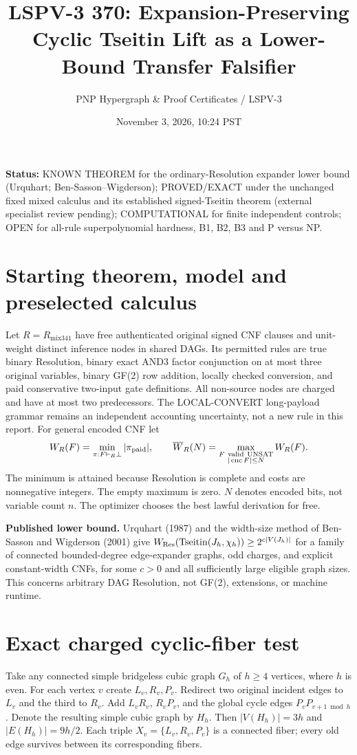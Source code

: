\documentclass[11pt]{article}
\title{LSPV-3 370: Expansion-Preserving Cyclic Tseitin Lift as a Lower-Bound Transfer Falsifier}
\author{PNP Hypergraph \& Proof Certificates / LSPV-3}
\date{November 3, 2026, 10:24 PST}
\begin{document}
\maketitle
\noindent\textbf{Status:} KNOWN THEOREM for the ordinary-Resolution expander lower bound (Urquhart; Ben-Sasson--Wigderson); PROVED/EXACT under the unchanged fixed mixed calculus and its established signed-Tseitin theorem (external specialist review pending); COMPUTATIONAL for finite independent controls; OPEN for all-rule superpolynomial hardness, B1, B2, B3 and P versus NP.

\section*{Starting theorem, model and preselected calculus}
Let $R=R_{\mathrm{mix341}}$ have free authenticated original signed CNF clauses and unit-weight distinct inference nodes in shared DAGs. Its permitted rules are true binary Resolution, binary exact AND3 factor conjunction on at most three original variables, binary GF(2) row addition, locally checked conversion, and paid conservative two-input gate definitions. All non-source nodes are charged and have at most two predecessors. The LOCAL-CONVERT long-payload grammar remains an independent accounting uncertainty, not a new rule in this report. For general encoded CNF let
\[
W_R(F)=\min_{\pi:F\vdash_R\bot}|\pi_{\rm paid}|,\qquad
\overline W_R(N)=\max_{\substack{F\ {\rm valid\ UNSAT}\\ |\operatorname{enc}F|\le N}}W_R(F).
\]
The minimum is attained because Resolution is complete and costs are nonnegative integers. The empty maximum is zero. $N$ denotes encoded bits, not variable count $n$. The optimizer chooses the best lawful derivation for free.

\textbf{Published lower bound.} Urquhart (1987) and the width-size method of Ben-Sasson and Wigderson (2001) give $W_{\rm Res}(\mathrm{Tseitin}(J_h,\chi_h))\ge 2^{c|V(J_h)|}$ for a family of connected bounded-degree edge-expander graphs, odd charges, and explicit constant-width CNFs, for some $c>0$ and all sufficiently large eligible graph sizes. This concerns arbitrary DAG Resolution, not GF(2), extensions, or machine runtime.

\section*{Exact charged cyclic-fiber test}
Take any connected simple bridgeless cubic graph $G_h$ of $h\ge4$ vertices, where $h$ is even. For each vertex $v$ create $L_v,R_v,P_v$. Redirect two original incident edges to $L_v$ and the third to $R_v$. Add $L_vR_v$, $R_vP_v$, and the global cycle edges $P_vP_{v+1\bmod h}$. Denote the resulting simple cubic graph by $H_h$. Then $|V(H_h)|=3h$ and $|E(H_h)|=9h/2$. Each triple $X_v=\{L_v,R_v,P_v\}$ is a connected fiber; every old edge survives between its corresponding fibers.
\end{document}
